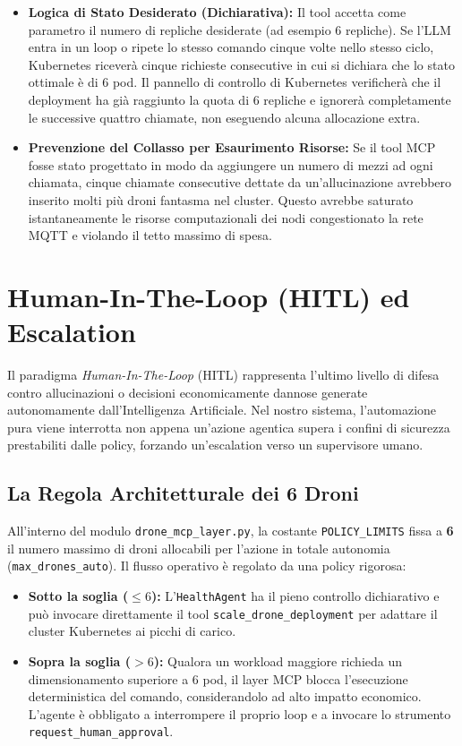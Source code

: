 \begin{itemize}
    \item \textbf{Logica di Stato Desiderato (Dichiarativa):} Il tool accetta come parametro il numero di repliche desiderate (ad esempio 6 repliche). Se l'LLM entra in un loop o ripete lo stesso comando cinque volte nello stesso ciclo, Kubernetes riceverà cinque richieste consecutive in cui si dichiara che lo stato ottimale è di 6 pod. Il pannello di controllo di Kubernetes verificherà che il deployment ha già raggiunto la quota di 6 repliche e ignorerà completamente le successive quattro chiamate, non eseguendo alcuna allocazione extra.
    \item \textbf{Prevenzione del Collasso per Esaurimento Risorse:} Se il tool MCP fosse stato progettato in modo da aggiungere un numero di mezzi ad ogni chiamata, cinque chiamate consecutive dettate da un'allucinazione avrebbero inserito molti più droni fantasma nel cluster. Questo avrebbe saturato istantaneamente le risorse computazionali dei nodi congestionato la rete MQTT e violando il tetto massimo di spesa.
\end{itemize}

\section{Human-In-The-Loop (HITL) ed Escalation}
\label{sec:hitl_escalation}
Il paradigma \textit{Human-In-The-Loop} (HITL) rappresenta l'ultimo livello di difesa contro allucinazioni o decisioni economicamente dannose generate autonomamente dall'Intelligenza Artificiale. Nel nostro sistema, l'automazione pura viene interrotta non appena un'azione agentica supera i confini di sicurezza prestabiliti dalle policy, forzando un'escalation verso un supervisore umano.

\subsection*{La Regola Architetturale dei 6 Droni}
All'interno del modulo \texttt{drone\_mcp\_layer.py}, la costante \texttt{POLICY\_LIMITS} fissa a \textbf{6} il numero massimo di droni allocabili per l'azione in totale autonomia (\texttt{max\_drones\_auto}). Il flusso operativo è regolato da una policy rigorosa:
\begin{itemize}
    \item \textbf{Sotto la soglia ($\le 6$):} L'\texttt{HealthAgent} ha il pieno controllo dichiarativo e può invocare direttamente il tool \texttt{scale\_drone\_deployment} per adattare il cluster Kubernetes ai picchi di carico.
    \item \textbf{Sopra la soglia ($> 6$):} Qualora un workload maggiore richieda un dimensionamento superiore a 6 pod, il layer MCP blocca l'esecuzione deterministica del comando, considerandolo ad alto impatto economico. L'agente è obbligato a interrompere il proprio loop e a invocare lo strumento \texttt{request\_human\_approval}.
\end{itemize}

